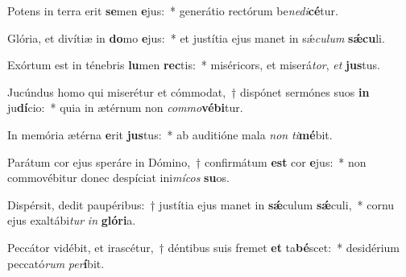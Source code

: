 \item Potens in terra erit \textbf{se}men \textbf{e}jus:~* generátio rectórum be\textit{ne}\textit{di}\textbf{cé}tur.
\item Glória, et divítiæ in \textbf{do}mo \textbf{e}jus:~* et justítia ejus manet in sǽ\textit{cu}\textit{lum} \textbf{sǽ}\textbf{cu}li.
\item Exórtum est in ténebris \textbf{lu}men \textbf{rec}tis:~* miséricors, et miserá\textit{tor}, \textit{et} \textbf{jus}tus.
\item Jucúndus homo qui miserétur et cómmodat,~† dispónet sermónes suos \textbf{in} ju\textbf{dí}cio:~* quia in ætérnum non \textit{com}\textit{mo}\textbf{vé}\textbf{bi}tur.
\item In memória ætérna \textbf{e}rit \textbf{jus}tus:~* ab auditióne mala \textit{non} \textit{ti}\textbf{mé}bit.
\item Parátum cor ejus speráre in Dómino,~† confirmátum \textbf{est} cor \textbf{e}jus:~* non commovébitur donec despíciat ini\textit{mí}\textit{cos} \textbf{su}os.
\item Dispérsit, dedit paupéribus:~† justítia ejus manet in \textbf{sǽ}culum \textbf{sǽ}culi,~* cornu ejus exaltábi\textit{tur} \textit{in} \textbf{gló}\textbf{ri}a.
\item Peccátor vidébit, et irascétur,~† déntibus suis fremet \textbf{et} ta\textbf{bé}scet:~* desidérium peccató\textit{rum} \textit{per}\textbf{í}bit.
